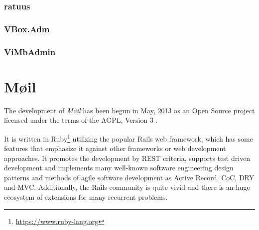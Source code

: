 \documentclass[12pt,a4paper]{scrartcl}
\begin{document}

			\subsubsection*{ratuus}

			\subsubsection*{VBox.Adm}

			\subsubsection*{ViMbAdmin}

	\section*{Møil}
		The development of \emph{Møil} has been begun in May, 2013 as an Open
		Source project licensed under the terms of the AGPL, Version 3
		\cite{agpl}.

		
		It is written in Ruby\footnote{\url{https://www.ruby-lang.org}}
		utilizing the popular \ac{Rails} web framework, which has some features
		that emphasize it against other frameworks or web development
		approaches. It promotes the development by \acs{REST} \cite{rest}
		criteria, supports test driven development and implements many
		well-known software engineering design patterns and methods of agile
		software development as Active Record, \ac{CoC}, \ac{DRY} and \ac{MVC}.
		Additionally, the \ac{Rails} community is quite vivid and there is an
		huge ecosystem of extensions for many recurrent problems.
		\s

\end{document}
